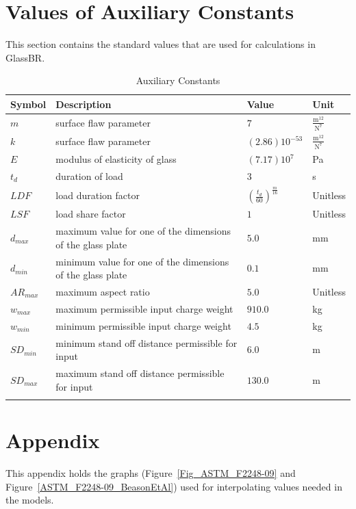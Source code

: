\documentclass[12pt]{article}
\begin{document}
\section{Values of Auxiliary Constants}
\label{Sec:ValuofAuxiCons}
This section contains the standard values that are used for calculations in GlassBR.
\begin{longtabu}{l X[l] l l}
\toprule
Symbol & Description & Value & Unit
\\
\midrule
$m$ & surface flaw parameter & $7$ & $\frac{\text{m}^{12}}{\text{N}^{7}}$
\\
$k$ & surface flaw parameter & $\left(2.86\right)10^{-53}$ & $\frac{\text{m}^{12}}{\text{N}^{7}}$
\\
$E$ & modulus of elasticity of glass & $\left(7.17\right)10^{7}$ & Pa
\\
${t_{d}}$ & duration of load & $3$ & s
\\
$LDF$ & load duration factor & $\left(\frac{{t_{d}}}{60}\right)^{\frac{m}{16}}$ & Unitless
\\
$LSF$ & load share factor & $1$ & Unitless
\\
${d_{max}}$ & maximum value for one of the dimensions of the glass plate & $5.0$ & mm
\\
${d_{min}}$ & minimum value for one of the dimensions of the glass plate & $0.1$ & mm
\\
${AR_{max}}$ & maximum aspect ratio & $5.0$ & Unitless
\\
${w_{max}}$ & maximum permissible input charge weight & $910.0$ & kg
\\
${w_{min}}$ & minimum permissible input charge weight & $4.5$ & kg
\\
${SD_{min}}$ & minimum stand off distance permissible for input & $6.0$ & m
\\
${SD_{max}}$ & maximum stand off distance permissible for input & $130.0$ & m
\\
\bottomrule
\caption{Auxiliary Constants}
\label{Table:AuxiCons}
\end{longtabu}





\section{Appendix}

This appendix holds the graphs (Figure~\ref{Fig_ASTM_F2248-09} and
Figure~\ref{ASTM_F2248-09_BeasonEtAl}) used for interpolating values needed in
the models.
\end{document}
